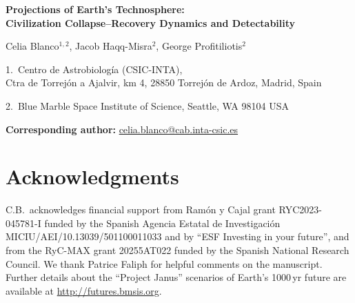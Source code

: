 \documentclass[11pt]{article}
\begin{document}
\begin{center}
{\LARGE\bfseries Projections of Earth's Technosphere: \\ Civilization Collapse--Recovery Dynamics and Detectability}

\vspace{2em}

{\large Celia Blanco$^{1,2}$, Jacob Haqq-Misra$^{2}$, George Profitiliotis$^{2}$}

\vspace{1em}

{\small 1.\ Centro de Astrobiolog\'{i}a (CSIC-INTA),\\
Ctra de Torrej\'{o}n a Ajalvir, km 4, 28850 Torrej\'{o}n de Ardoz, Madrid, Spain}

\vspace{0.3em}

{\small 2.\ Blue Marble Space Institute of Science, Seattle, WA 98104 USA}

\vspace{2em}

{\bfseries Corresponding author:} \href{mailto:celia.blanco@cab.inta-csic.es}{celia.blanco@cab.inta-csic.es}
\end{center}

\vspace{3em}

\section*{Acknowledgments}
C.B.\ acknowledges financial support from Ram\'{o}n y Cajal grant RYC2023-045781-I funded by the Spanish Agencia Estatal de Investigaci\'{o}n MICIU/AEI/10.13039/501100011033 and by ``ESF Investing in your future'', and from the RyC-MAX grant 20255AT022 funded by the Spanish National Research Council. We thank Patrice Faliph for helpful comments on the manuscript. Further details about the ``Project Janus'' scenarios of Earth's 1000\,yr future are available at \url{http://futures.bmsis.org}.
\end{document}
